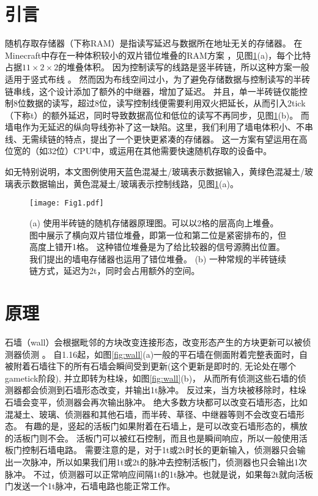 \documentclass[UTF8,12pt,punct=kaiming,fontset=none]{ctexart}
\newcommand*{\upcite}[1]{
    \textsuperscript{\cite{#1}}
}
\begin{document}
\section{引言}
随机存取存储器（下称RAM）是指读写延迟与数据所在地址无关的存储器。
在Minecraft中存在一种体积较小的双片错位堆叠的RAM方案\upcite{ORE}，见图\ref{fig:normalRAM}(a)，每个比特占据$11\times 2\times 2$的堆叠体积。
因为控制读写的线路是竖半砖链，所以这种方案一般适用于竖式布线\upcite{Vertical}。
然而因为布线空间过小，为了避免存储数据与控制读写的半砖链串线，这个设计添加了额外的中继器，增加了延迟。
并且，单一半砖链仅能控制8位数据的读写，超过8位，读写控制线便需要利用双火把延长，从而引入2tick（下称t）的额外延迟，同时导致数据高位和低位的读写不再同步，见图\ref{fig:normalRAM}(b)。
而墙电作为无延迟的纵向导线弥补了这一缺陷。这里，我们利用了墙电体积小、不串线、无需续链的特点，提出了一个更快更紧凑的存储器。
这一方案有望运用在高位宽的（如32位）CPU中，或运用在其他需要快速随机存取的设备中。

如无特别说明，本文图例使用天蓝色混凝土/玻璃表示数据输入，黄绿色混凝土/玻璃表示数据输出，黄色混凝土/玻璃表示控制线路，见图\ref{fig:normalRAM}(a)。
\begin{figure}[t]
    \centering
    \texttt{[image: Fig1.pdf]}
    \caption{\small (a) 使用半砖链的随机存储器原理图。可以以2格的层高向上堆叠。
    图中展示了横向双片错位堆叠，即第一位和第二位是紧密排布的，但高度上错开1格。
    这种错位堆叠是为了给比较器的信号源腾出位置。我们提出的墙电存储器也运用了错位堆叠。
    (b) 一种常规的半砖链续链方式，延迟为2t，同时会占用额外的空间。}
    \label{fig:normalRAM}
\end{figure}

\section{原理}
石墙（wall）会根据毗邻的方块改变连接形态，改变形态产生的方块更新可以被侦测器侦测\upcite{Wall}。
自1.16起，如图\ref{fig:wall}(a)一般的平石墙在侧面附着完整表面时，自被附着石墙往下的所有石墙会瞬间受到更新(这个更新是即时的, 无论处在哪个gametick阶段), 并立即转为柱垛，如图\ref{fig:wall}(b)，
从而所有侦测这些石墙的侦测器都会侦测到石墙形态改变，并输出1t脉冲。
反过来，当方块被移除时，柱垛石墙会变平，侦测器会再次输出脉冲。
绝大多数方块都可以改变石墙形态，比如混凝土、玻璃、侦测器和其他石墙，而半砖、草径、中继器等则不会改变石墙形态。
有趣的是，竖起的活板门如果附着在石墙上，是可以改变石墙形态的，横放的活板门则不会。
活板门可以被红石控制，而且也是瞬间响应，所以一般使用活板门控制石墙电路。
需要注意的是，对于1t或2t时长的更新输入，侦测器只会输出一次脉冲，所以如果我们用1t或2t的脉冲去控制活板门，侦测器也只会输出1次脉冲。
不过，侦测器可以正常响应间隔1t的1t脉冲。也就是说，如果每2t就向活板门发送一个1t脉冲，石墙电路也能正常工作。
\end{document}
